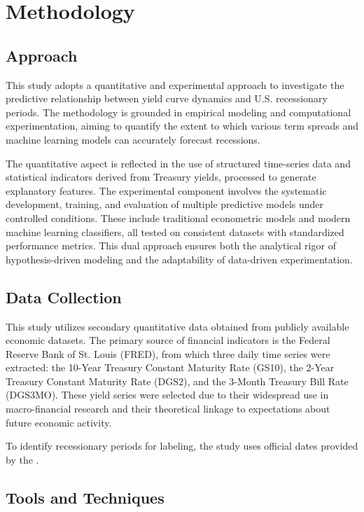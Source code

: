 
\section{Methodology}


\subsection{Approach}
This study adopts a quantitative and experimental approach to investigate the predictive relationship between yield curve dynamics and U.S. recessionary periods. The methodology is grounded in empirical modeling and computational experimentation, aiming to quantify the extent to which various term spreads and machine learning models can accurately forecast recessions.

The quantitative aspect is reflected in the use of structured time-series data and statistical indicators derived from Treasury yields, processed to generate explanatory features. The experimental component involves the systematic development, training, and evaluation of multiple predictive models under controlled conditions. These include traditional econometric models and modern machine learning classifiers, all tested on consistent datasets with standardized performance metrics. This dual approach ensures both the analytical rigor of hypothesis-driven modeling and the adaptability of data-driven experimentation.

\subsection{Data Collection}

This study utilizes secondary quantitative data obtained from publicly available economic datasets. The primary source of financial indicators is the Federal Reserve Bank of St. Louis (FRED), from which three daily time series were extracted: the 10-Year Treasury Constant Maturity Rate (GS10), the 2-Year Treasury Constant Maturity Rate (DGS2), and the 3-Month Treasury Bill Rate (DGS3MO). These yield series were selected due to their widespread use in macro-financial research and their theoretical linkage to expectations about future economic activity.

To identify recessionary periods for labeling, the study uses official dates provided by the \textcite{NBERRecession}. 


\subsection{Tools and Techniques}

